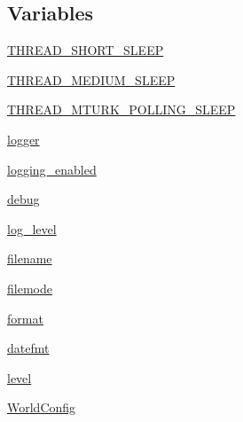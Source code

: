 \subsection*{Variables}
\begin{DoxyCompactItemize}
\item 
\hyperlink{namespaceparlai_1_1chat__service_1_1services_1_1messenger_1_1shared__utils_a51b0703c1b2744732b15834a59515257}{T\+H\+R\+E\+A\+D\+\_\+\+S\+H\+O\+R\+T\+\_\+\+S\+L\+E\+EP}
\item 
\hyperlink{namespaceparlai_1_1chat__service_1_1services_1_1messenger_1_1shared__utils_a47401686f36ca4a03e851879500f4d5a}{T\+H\+R\+E\+A\+D\+\_\+\+M\+E\+D\+I\+U\+M\+\_\+\+S\+L\+E\+EP}
\item 
\hyperlink{namespaceparlai_1_1chat__service_1_1services_1_1messenger_1_1shared__utils_abcd39efee3ffff42437f9728570b09f5}{T\+H\+R\+E\+A\+D\+\_\+\+M\+T\+U\+R\+K\+\_\+\+P\+O\+L\+L\+I\+N\+G\+\_\+\+S\+L\+E\+EP}
\item 
\hyperlink{namespaceparlai_1_1chat__service_1_1services_1_1messenger_1_1shared__utils_a619c782b4554bd799a6d2c8d3f46d45d}{logger}
\item 
\hyperlink{namespaceparlai_1_1chat__service_1_1services_1_1messenger_1_1shared__utils_a481af455390b40e3c57ea39dd6ad072b}{logging\+\_\+enabled}
\item 
\hyperlink{namespaceparlai_1_1chat__service_1_1services_1_1messenger_1_1shared__utils_aa19c12f9c75073f49e76e6a89b3b77c0}{debug}
\item 
\hyperlink{namespaceparlai_1_1chat__service_1_1services_1_1messenger_1_1shared__utils_accb5c9988dca62a46e243f84574b9ccc}{log\+\_\+level}
\item 
\hyperlink{namespaceparlai_1_1chat__service_1_1services_1_1messenger_1_1shared__utils_a13a4b70d7eeaebd92b382f1f79d6183d}{filename}
\item 
\hyperlink{namespaceparlai_1_1chat__service_1_1services_1_1messenger_1_1shared__utils_a86b5a9127568ffe3778ee2627ad5f1fe}{filemode}
\item 
\hyperlink{namespaceparlai_1_1chat__service_1_1services_1_1messenger_1_1shared__utils_a32e2e2022b824fbaf80c747160b52a76}{format}
\item 
\hyperlink{namespaceparlai_1_1chat__service_1_1services_1_1messenger_1_1shared__utils_ac2178d68efd5a7cca079a851ff5ee252}{datefmt}
\item 
\hyperlink{namespaceparlai_1_1chat__service_1_1services_1_1messenger_1_1shared__utils_a35382c2e2179499d2a3debea2689be93}{level}
\item 
\hyperlink{namespaceparlai_1_1chat__service_1_1services_1_1messenger_1_1shared__utils_a2fad0a70ab62b27b2692978de3a852f1}{World\+Config}
\end{DoxyCompactItemize}


